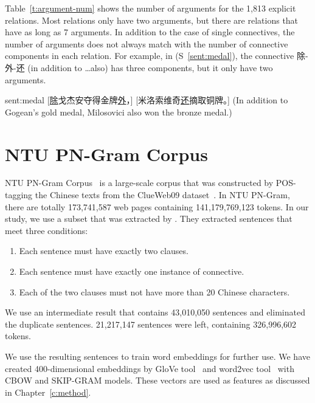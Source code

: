 

Table~\ref{t:argument-num} shows the number of arguments for the 1,813 explicit
relations. Most relations only have two arguments, but there are relations
that have as long as 7 arguments. In addition to the case of single connectives,
the number of arguments does not always
match with the number of connective components in each relation. For example,
in (S~\ref{sent:medal}), the connective 除-外-还 (in addition to \ldots also)
has three components, but it only have two arguments.




\begin{sent}{sent:medal}{}
    [\underline{除}戈杰安夺得金牌\underline{外}，]
    [米洛索维奇\underline{还}摘取铜牌。]
    (In addition to Gogean's gold medal, Milosovici also won the bronze medal.)
\end{sent}

\section{NTU PN-Gram Corpus}

NTU PN-Gram Corpus~\citep{yu2012development} is a large-scale corpus that was
constructed by POS-tagging the Chinese texts from the ClueWeb09
dataset~\citep{callan2009clueweb09}. In NTU PN-Gram, there are totally 173,741,587
web pages containing 141,179,769,123 tokens. In our study, we use a subset that
was extracted by \cite{huang2014interpretation}. They extracted sentences that
meet three conditions:

\begin{enumerate}
\item Each sentence must have exactly two clauses.
\item Each sentence must have exactly one instance of connective.
\item Each of the two clauses must not have more than 20 Chinese characters.
\end{enumerate}

We use an intermediate result that contains 43,010,050 sentences and eliminated
the duplicate sentences. 21,217,147 sentences were left, containing
326,996,602 tokens.

We use the resulting sentences to train word embeddings for further use.
We have created 400-dimensional embeddings by GloVe tool~\citep{pennington2014glove}
and word2vec tool~\citep{mikolov2013efficient,mikolov2013distributed} with CBOW and
SKIP-GRAM models. These vectors are used as features as discussed in Chapter~\ref{c:method}.
